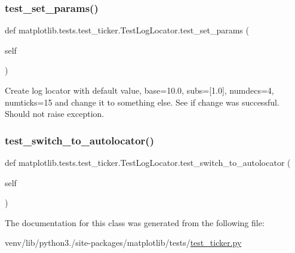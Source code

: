 \mbox{\label{classmatplotlib_1_1tests_1_1test__ticker_1_1TestLogLocator_a239f5822dc1771184e1fc8d74b4978b0}} 
\subsubsection{\texorpdfstring{test\+\_\+set\+\_\+params()}{test\_set\_params()}}
{\footnotesize\ttfamily def matplotlib.\+tests.\+test\+\_\+ticker.\+Test\+Log\+Locator.\+test\+\_\+set\+\_\+params (\begin{DoxyParamCaption}\item[{}]{self }\end{DoxyParamCaption})}

\begin{DoxyVerb}Create log locator with default value, base=10.0, subs=[1.0],
numdecs=4, numticks=15 and change it to something else.
See if change was successful. Should not raise exception.
\end{DoxyVerb}
 \mbox{\label{classmatplotlib_1_1tests_1_1test__ticker_1_1TestLogLocator_ad1e498a7cf47158f9300e582e01391e9}} 
\subsubsection{\texorpdfstring{test\+\_\+switch\+\_\+to\+\_\+autolocator()}{test\_switch\_to\_autolocator()}}
{\footnotesize\ttfamily def matplotlib.\+tests.\+test\+\_\+ticker.\+Test\+Log\+Locator.\+test\+\_\+switch\+\_\+to\+\_\+autolocator (\begin{DoxyParamCaption}\item[{}]{self }\end{DoxyParamCaption})}



The documentation for this class was generated from the following file\+:\begin{DoxyCompactItemize}
\item 
venv/lib/python3./site-\/packages/matplotlib/tests/\hyperlink{test__ticker_8py}{test\+\_\+ticker.\+py}\end{DoxyCompactItemize}
